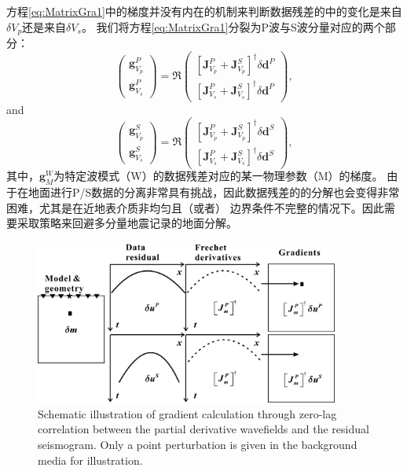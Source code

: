 方程\eqref{eq:MatrixGra1}中的梯度并没有内在的机制来判断数据残差的中的变化是来自$\delta V_p$还是来自$\delta V_s$。
我们将方程\eqref{eq:MatrixGra1}分裂为P波与S波分量对应的两个部分：
\begin{equation}
        \begin{pmatrix}
                \mathbf{g}^P_{V_p}\\
                \mathbf{g}^P_{V_s}
        \end{pmatrix}
        =\mathfrak{R}\begin{pmatrix}
                [\mathbf{J}^P_{V_p}+\mathbf{J}^S_{V_p}]^{\dagger}\delta \mathbf{d}^P\\
                [\mathbf{J}^P_{V_s}+\mathbf{J}^S_{V_s}]^{\dagger}\delta \mathbf{d}^P
        \end{pmatrix},
        \label{eq:DEMatrixGraP}
\end{equation}
and
\begin{equation}
        \begin{pmatrix}
                \mathbf{g}^S_{V_p}\\
                \mathbf{g}^S_{V_s}
        \end{pmatrix}
        =\mathfrak{R}\begin{pmatrix}
                [\mathbf{J}^P_{V_p}+\mathbf{J}^S_{V_p}]^{\dagger}\delta \mathbf{d}^S\\
                [\mathbf{J}^P_{V_s}+\mathbf{J}^S_{V_s}]^{\dagger}\delta \mathbf{d}^S
        \end{pmatrix},
        \label{eq:DEMatrixGraS}
\end{equation}
其中，$\mathbf{g}^W_M$为特定波模式（W）的数据残差对应的某一物理参数（M）的梯度。
由于在地面进行P/S数据的分离非常具有挑战，因此数据残差的的分解也会变得非常困难，尤其是在近地表介质非均匀且（或者）
边界条件不完整的情况下。因此需要采取策略来回避多分量地震记录的地面分解。
\begin{figure}
    \begin{center}
        \includegraphics[width=10cm]{Figure/chapter02/finalMarmousiII/Fig/zerolagLAST1.pdf}
        \caption{
Schematic illustration of gradient calculation through zero-lag correlation
 between the partial derivative wavefields
and the residual seismogram.
Only a point perturbation is given in the background media for illustration.
    }
    \label{fig:crossterm}
    \end{center}
\end{figure}

